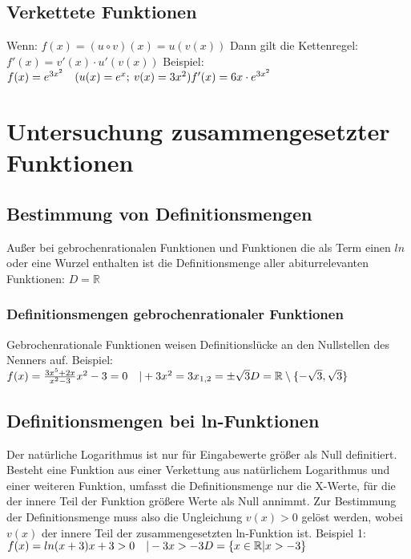 \documentclass{article}
\begin{document}
    \subsection*{Verkettete Funktionen}
    Wenn: \break
    $f(x) = (u \circ v)(x) = u(v(x))$
    \break
    Dann gilt die Kettenregel:\break
    $f'(x) = v'(x) \cdot u'(v(x))$
    \break \break
    Beispiel: \break \break
        $f(x) = e^{3x^2} \quad (u(x) = e^x;\: v(x) = 3x^2)\break f'(x) = 6x \cdot e^{3x^2}$

    \pagebreak

\section*{Untersuchung zusammengesetzter Funktionen}
\subsection*{Bestimmung von Definitionsmengen}
Außer bei gebrochenrationalen Funktionen und Funktionen die als Term einen $ln$ oder eine Wurzel
enthalten ist die Definitionsmenge aller abiturrelevanten Funktionen: $D = \mathbb{R}$
    \subsubsection*{Definitionsmengen gebrochenrationaler Funktionen}
    Gebrochenrationale Funktionen weisen Definitionslücke an den Nullstellen des Nenners auf.
    \break \break
    Beispiel: \break \break
    $f(x) = \frac{3x^5+2x}{x^2-3} \break \break
    x^2-3 = 0 \quad |+3 \break
    x^2 = 3 \break
    x_{1,2} = \pm\sqrt{3} \break \break
    D = \mathbb{R} \setminus \{ -\sqrt{3},\sqrt{3} \}
    $

    \subsection*{Definitionsmengen bei ln-Funktionen}
    Der natürliche Logarithmus ist nur für Eingabewerte größer als Null definitiert.
    Besteht eine Funktion aus einer Verkettung aus natürlichem Logarithmus und einer weiteren Funktion,
    umfasst die Definitionsmenge nur die X-Werte, für die der innere Teil der Funktion größere Werte als Null annimmt.
    Zur Bestimmung der Definitionsmenge muss also die Ungleichung $v(x) > 0$ gelöst werden, wobei $v(x)$ der innere Teil der zusammengesetzten ln-Funktion ist.
    \break \break
    Beispiel 1:\break \break
    $
    f(x) = ln(x+3) \break \break
    x+3 > 0 \quad |-3 \break
    x > -3 \break \break
    D = \{x \in \mathbb{R}| x > -3\}
    $
    \pagebreak
\end{document}
